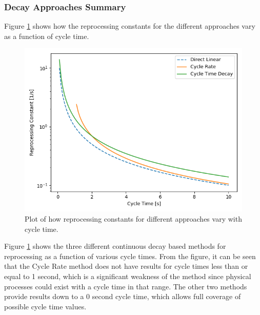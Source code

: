 


\subsubsection{Decay Approaches Summary}

Figure \ref{fig:repr_cnst} shows how the reprocessing constants for the different approaches vary as a function of cycle time.

\begin{figure}[H]
  \centering
  \includegraphics[scale=0.45]{images/cont-compare-cycles.png}
  \caption{Plot of how reprocessing constants for different approaches vary with cycle time.}
   \label{fig:repr_cnst}
\end{figure}

Figure \ref{fig:repr_cnst} shows the three different continuous decay based methods for reprocessing as a function of various cycle times. From the figure, it can be seen that the Cycle Rate method does not have results for cycle times less than or equal to 1 second, which is a significant weakness of the method since physical processes could exist with a cycle time in that range. The other two methods provide results down to a 0 second cycle time, which allows full coverage of possible cycle time values.

